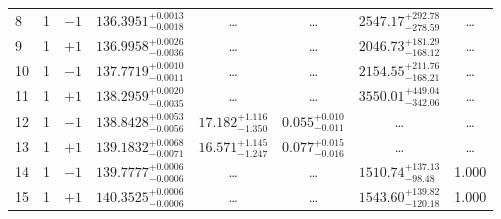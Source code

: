 \begin{table*}[!]
\begin{tabular}{llcrrlrc}
8 & 1 &$-1$ & $    136.3951_{-      0.0018}^{+      0.0013}$ & \multicolumn{1}{c}{\dots} & \multicolumn{1}{c}{\dots} & $     2547.17_{-      278.59}^{+      292.78}$ & \dots\\[1pt]
9 & 1 &$+1$ & $    136.9958_{-      0.0036}^{+      0.0026}$ & \multicolumn{1}{c}{\dots} & \multicolumn{1}{c}{\dots} & $     2046.73_{-      168.12}^{+      181.29}$ & \dots\\[1pt]
10 & 1 &$-1$ & $    137.7719_{-      0.0011}^{+      0.0010}$ & \multicolumn{1}{c}{\dots} & \multicolumn{1}{c}{\dots} & $     2154.55_{-      168.21}^{+      211.76}$ & \dots\\[1pt]
11 & 1 &$+1$ & $    138.2959_{-      0.0035}^{+      0.0020}$ & \multicolumn{1}{c}{\dots} & \multicolumn{1}{c}{\dots} & $     3550.01_{-      342.06}^{+      449.04}$ & \dots\\[1pt]
12 & 1 & $-1$& $    138.8428_{-      0.0056}^{+      0.0053}$ & $      17.182_{-       1.350}^{+       1.116}$ & $       0.055_{-       0.011}^{+       0.010}$ & \multicolumn{1}{c}{\dots} & \dots\\[1pt]
13 & 1 & $+1$& $    139.1832_{-      0.0071}^{+      0.0068}$ & $      16.571_{-       1.247}^{+       1.145}$ & $       0.077_{-       0.016}^{+       0.015}$ & \multicolumn{1}{c}{\dots} & \dots\\[1pt]
14 & 1 & $-1$& $    139.7777_{-      0.0006}^{+      0.0006}$ & \multicolumn{1}{c}{\dots} & \multicolumn{1}{c}{\dots} & $     1510.74_{-       98.48}^{+      137.13}$ & 1.000\\[1pt]
15 & 1 & $+1$& $    140.3525_{-      0.0006}^{+      0.0006}$ & \multicolumn{1}{c}{\dots} & \multicolumn{1}{c}{\dots} & $     1543.60_{-      120.18}^{+      139.82}$ & 1.000 \\[1pt]
 

\end{tabular}
\end{table*}
